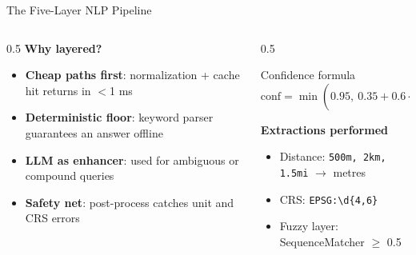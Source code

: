 \documentclass[aspectratio=169,11pt]{beamer}
\newcommand{\kw}[1]{{\color{geositeal}\bfseries #1}}
\begin{document}
\begin{frame}{The Five-Layer NLP Pipeline}
  \vspace{0.5em}
  \begin{columns}[T,onlytextwidth]
    \begin{column}{0.5\textwidth}
      \small\textbf{Why layered?}
      \begin{itemize}
        \item \kw{Cheap paths first}: normalization + cache hit returns in $<$1 ms
        \item \kw{Deterministic floor}: keyword parser guarantees an answer offline
        \item \kw{LLM as enhancer}: used for ambiguous or compound queries
        \item \kw{Safety net}: post-process catches unit and CRS errors
      \end{itemize}
    \end{column}
    \begin{column}{0.5\textwidth}
      \begin{block}{Confidence formula}
\[
  \text{conf} = \min\!\left(0.95,\ 0.35 + 0.6 \cdot \frac{\text{top\_score}}{\text{total\_signal}}\right)
\]
      \end{block}
      \small\textbf{Extractions performed}
      \begin{itemize}
        \item Distance: \texttt{500m, 2km, 1.5mi} $\rightarrow$ metres
        \item CRS: \texttt{EPSG:\textbackslash d\{4,6\}}
        \item Fuzzy layer: SequenceMatcher $\geq$ 0.5
      \end{itemize}
    \end{column}
  \end{columns}
\end{frame}
\end{document}
